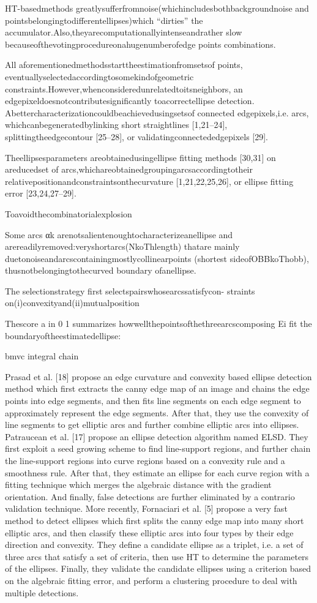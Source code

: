 \documentclass[a4paper]{report}
\begin{document}
HT-basedmethods
greatlysufferfromnoise(whichincludesbothbackgroundnoise
and pointsbelongingtodifferentellipses)which “dirties” the
accumulator.Also,theyarecomputationallyintenseandrather
slow becauseofthevotingprocedureonahugenumberofedge
points combinations.

All aforementionedmethodsstarttheestimationfromsetsof
points, eventuallyselectedaccordingtosomekindofgeometric
constraints.However,whenconsideredunrelatedtoitsneighbors,
an edgepixeldoesnotcontributesignificantly toacorrectellipse
detection. Abettercharacterizationcouldbeachievedusingsetsof
connected edgepixels,i.e. arcs, whichcanbegeneratedbylinking
short straightlines [1,21–24], splittingtheedgecontour [25–28],
or validatingconnectededgepixels [29].

Theellipsesparameters
areobtainedusingellipse fitting methods [30,31] on areducedset
of arcs,whichareobtainedgroupingarcsaccordingtotheir
relativepositionandconstraintsonthecurvature [1,21,22,25,26],
or ellipse fitting error [23,24,27–29].

Toavoidthecombinatorialexplosion

Some arcs αk arenotsalientenoughtocharacterizeanellipse
and arereadilyremoved:veryshortarcs(NkoThlength) thatare
mainly duetonoiseandarcscontainingmostlycollinearpoints
(shortest sideofOBBkoThobb), thusnotbelongingtothecurved
boundary ofanellipse.

The selectionstrategy first selectspairswhosearcssatisfycon-
straints on(i)convexityand(ii)mutualposition


Thescore a in 0 1
summarizes howwellthepointsofthethreearcscomposing Ei fit
the boundaryoftheestimatedellipse:

bmvc integral chain

Prasad et al. [18] propose an edge curvature and convexity
based ellipse detection method which first extracts the canny edge map of an image
and chains the edge points into edge segments, and then fits line segments on each edge
segment to approximately represent the edge segments. After that, they use the convexity of
line segments to get elliptic arcs and further combine elliptic arcs into ellipses. Patraucean
et al. [17] propose an ellipse detection algorithm named ELSD. They first exploit a seed
growing scheme to find line-support regions, and further chain the line-support regions into
curve regions based on a convexity rule and a smoothness rule. After that, they estimate an
ellipse for each curve region with a fitting technique which merges the algebraic distance
with the gradient orientation. And finally, false detections are further eliminated by a contrario
validation technique. More recently, Fornaciari et al. [5] propose a very fast method
to detect ellipses which first splits the canny edge map into many short elliptic arcs, and then
classify these elliptic arcs into four types by their edge direction and convexity. They define
a candidate ellipse as a triplet, i.e. a set of three arcs that satisfy a set of criteria, then use
HT to determine the parameters of the ellipses. Finally, they validate the candidate ellipses
using a criterion based on the algebraic fitting error, and perform a clustering procedure to
deal with multiple detections.
\end{document}
